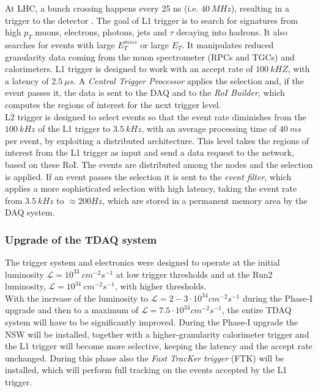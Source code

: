 \documentclass[a4paper,twoside,12pt]{article}
\begin{document}
At LHC, a bunch crossing happens every 25 ns (i.e. $40\ MHz$), resulting in a trigger to the detector . The goal of L1 trigger is to search for signatures from high $p_{T}$ muons, electrons,
photons, jets and $\tau$ decaying into hadrons. It also searches for events with large $E_{T}^{miss}$ or large $E_{T}$. It manipulates reduced granularity data coming from the muon
spectrometer (RPCs and TGCs) and calorimeters. L1 trigger is designed to work with an accept rate of $100\ kHZ$, with a latency of $2.5\ \mu s$. A \textit{Central Trigger Processor} applies
the selection and, if the event passes it, the data is
sent to the DAQ and to the \textit{RoI Builder}, which computes the regions of interest for the next trigger level.\\
L2 trigger is designed to select events so that the event rate diminishes from the $100\ kHz$ of the L1 trigger to $3.5\ kHz$, with an average processing time of $40\ ms$ per event, by
exploiting a distributed architecture. This
level takes the regions of interest from the L1 trigger as input and send a data request to the network, based on these RoI. The events are distributed among the nodes and the selection is applied. If an event passes the selection it is sent to the \textit{event filter}, which applies a more sophisticated selection with high latency, taking the event rate from $3.5\ kHz$ to $\approx 200 Hz$, which are stored in a permanent memory area by the DAQ system.

\subsubsection*{Upgrade of the TDAQ system}
The trigger system and electronics were designed to operate at the initial luminosity 
$\mathcal{L} = 10^{33}\ cm^{-2}s^{-1}$ at low trigger thresholds and at the Run2
luminosity, $\mathcal{L} = 10^{34}\ cm^{-2}s^{-1}$, with higher thresholds\cite{scoping}.\\

With the increase of the luminosity to $\mathcal{L} = 2-3 \cdot 10^{34} cm^{-2}s^{-1}$ during
the Phase-I upgrade and then to a maximum of $\mathcal{L} = 7.5 \cdot 10^{34} cm^{-2}s^{-1}$, the entire TDAQ system will have to be significantly improved. During the Phase-I upgrade the NSW will be installed, together with a higher-granularity calorimeter
trigger and the L1 trigger will become more selective, keeping the latency and the accept rate unchanged. During this phase also the \textit{Fast TracKer trigger} (FTK)\cite{FTK_TDR} will be installed, which will perform
full tracking on the events accepted by the L1 trigger. \\
\end{document}
